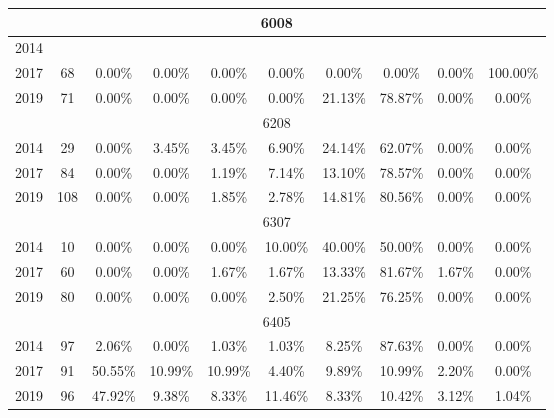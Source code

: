 \begin{table}[H]
\begin{tabular}{|l|c|ccc|ccc|cc|}
\hline
\hline
\multicolumn{10}{|c|}{6008}\\
\hline
2014 & & & & & & & & & \\
2017 & 68 & 0.00\% & 0.00\% & 0.00\% & 0.00\% & 0.00\% & 0.00\% & 0.00\% & 100.00\%\\
2019 & 71 & 0.00\% & 0.00\% & 0.00\% & 0.00\% & 21.13\% & 78.87\% & 0.00\% & 0.00\%\\
\hline
\hline
\multicolumn{10}{|c|}{6208}\\
\hline
2014 & 29 & 0.00\% & 3.45\% & 3.45\% & 6.90\% & 24.14\% & 62.07\% & 0.00\% & 0.00\%\\
2017 & 84 & 0.00\% & 0.00\% & 1.19\% & 7.14\% & 13.10\% & 78.57\% & 0.00\% & 0.00\%\\
2019 & 108 & 0.00\% & 0.00\% & 1.85\% & 2.78\% & 14.81\% & 80.56\% & 0.00\% & 0.00\%\\
\hline
\hline
\multicolumn{10}{|c|}{6307}\\
\hline
2014 & 10 & 0.00\% & 0.00\% & 0.00\% & 10.00\% & 40.00\% & 50.00\% & 0.00\% & 0.00\%\\
2017 & 60 & 0.00\% & 0.00\% & 1.67\% & 1.67\% & 13.33\% & 81.67\% & 1.67\% & 0.00\%\\
2019 & 80 & 0.00\% & 0.00\% & 0.00\% & 2.50\% & 21.25\% & 76.25\% & 0.00\% & 0.00\%\\
\hline
\hline
\multicolumn{10}{|c|}{6405}\\
\hline
2014 & 97 & 2.06\% & 0.00\% & 1.03\% & 1.03\% & 8.25\% & 87.63\% & 0.00\% & 0.00\%\\
2017 & 91 & 50.55\% & 10.99\% & 10.99\% & 4.40\% & 9.89\% & 10.99\% & 2.20\% & 0.00\%\\
2019 & 96 & 47.92\% & 9.38\% & 8.33\% & 11.46\% & 8.33\% & 10.42\% & 3.12\% & 1.04\%\\
\hline
\bottomrule
\end{tabular}
\end{table}
